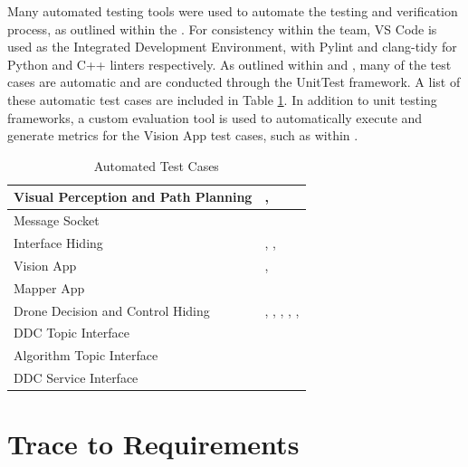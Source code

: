 \documentclass[12pt, titlepage]{article}
\begin{document}
Many automated testing tools were used to automate the testing and verification process, as outlined within the . For consistency within the team, VS Code is used as the Integrated Development Environment, with Pylint and clang-tidy for Python and C++ linters respectively. As outlined within  and , many of the test cases are automatic and are conducted through the UnitTest framework. A list of these automatic test cases are included in Table \ref{tab:automatedTestCases}. In addition to unit testing frameworks, a custom evaluation tool is used to automatically execute and generate metrics for the Vision App test cases, such as within . 

\begin{table}[!h]
\begin{center}
\caption {Automated Test Cases}
\label{tab:automatedTestCases}
\begin{tabular}{ | m{9.2cm} | m{6.2cm} | } 
\hline
Visual Perception and Path Planning & \nameref{tab:STC_015}, \nameref{tab:STC_016} \\ 
\hline
Message Socket & \nameref{tab:UTC_007} \\ 
\hline
Interface Hiding & \nameref{tab:UTC_008}, \nameref{tab:UTC_009}, \nameref{tab:UTC_010} \\ 
\hline
Vision App & \nameref{tab:UTC_011}, \nameref{tab:UTC_012} \\ 
\hline
Mapper App & \nameref{tab:UTC_013} \\ 
\hline
Drone Decision and Control Hiding & \nameref{tab:UTC_014}, \nameref{tab:UTC_015}, \nameref{tab:UTC_016}, \nameref{tab:UTC_017}, \nameref{tab:UTC_018}, \nameref{tab:UTC_019} \\ 
\hline
DDC Topic Interface & \nameref{tab:UTC_020} \\ 
\hline
Algorithm Topic Interface & \nameref{tab:UTC_021} \\ 
\hline
DDC Service Interface & \nameref{tab:UTC_022} \\ 
\hline
\end{tabular}
\end{center}
\end{table}

\clearpage


		
\section{Trace to Requirements}
\end{document}
